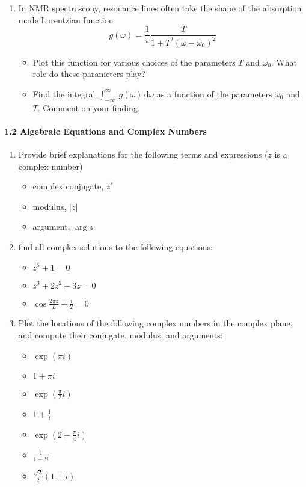 \documentclass{chem6155problemset}
\begin{document}
\begin{enumerate}
	 \item In NMR spectroscopy, resonance lines often take the shape of the absorption mode Lorentzian function
	 \[\displaystyle g(\omega) = \frac{1}{\pi} \frac{T}{1+T^2(\omega-\omega_0)^2}\]
	 \begin{itemize}
	  \item Plot this function for various choices of the parameters $T$ and $\omega_0$. What
	 	role do these parameters play?
	  \item Find the integral $\int_{-\infty}^\infty\,g(\omega)\,\mathrm{d}\omega$ as a
	  function of the parameters $\omega_0$ and $T$. Comment on your finding.
	  \end{itemize}
\end{enumerate}

\paragraph{1.2 Algebraic Equations and Complex Numbers}

\begin{enumerate}[resume]
	\item Provide brief explanations for the following terms and expressions ($z$ is a complex number)
	\begin{itemize}
		\item complex conjugate, $z^\ast$
		\item modulus, $|z|$
		\item argument, $\arg z$
	\end{itemize}

	\item find all complex solutions to the following equations:
	\begin{itemize}
	 	\item $z^5 + 1 = 0$
		\item $z^3+2z^2+3z = 0$
		\item $\cos\frac{2\pi z}{L} + \frac{i}{2} =0$
	\end{itemize}
      \item Plot the locations of the following complex numbers in the complex plane, and compute their
	conjugate, modulus, and arguments:
	\begin{itemize}
	  \item $\exp(\pi i)$
	  \item $1+\pi i$
	  \item $\exp(\frac{\pi}{2}i)$
	  \item $1+\frac{1}{i}$
	  \item $\exp(2+\frac{\pi}{4}i)$
	  \item $\frac{1}{1-3i}$
	  \item $\frac{\sqrt{2}}{2}(1+i)$
	\end{itemize}
\end{enumerate}
\end{document}
